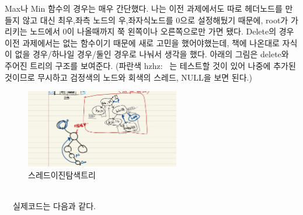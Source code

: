 \documentclass[a4paper,11pt]{article}
\begin{document}
Max나 Min 함수의 경우는 매우 간단했다. 나는 이전 과제에서도 따로 헤더노드를 만들지 않고 대신 최우,좌측 노드의 우,좌자식노드를 0으로 설정해뒀기 때문에, root가 가리키는 노드에서 0이 나올때까지 쭉 왼쪽이나 오른쪽으로만 가면 됐다. Delete의 경우 이전 과제에서는 없는 함수이기 때문에 새로 고민을 했어야했는데, 책에 나온대로 자식이 없을 경우/하나일 경우/둘인 경우로 나눠서 생각을 했다. 아래의 그림은 delete와 주어진 트리의 구조를 보여준다. (파란색 hzhz:~ 는 테스트할 것이 있어 나중에 추가된 것이므로 무시하고 검정색의 노드와 회색의 스레드, NULL을 보면 된다.)\\
\begin{figure}[h]
\begin{center}
\includegraphics[width=0.6\textwidth]{bst}
\caption{스레드이진탐색트리}
\label{fig:fig1}
\end{center}
\end{figure}
\\ \ \ 실제코드는 다음과 같다.
\end{document}
